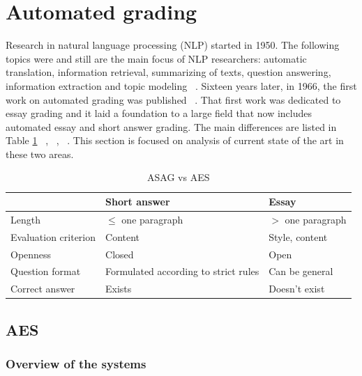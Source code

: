 \section{\textbf{Automated grading}}

Research in natural language processing (NLP) started in 1950. The following topics were and still are the main focus of NLP researchers: automatic translation, information retrieval, summarizing of texts, question answering, information extraction and topic modeling  ~\cite{Cambria}. Sixteen years later, in 1966, the first work on automated grading was published ~\cite{Page}. That first work was dedicated to essay grading and it laid a foundation to a large field that now includes automated essay and short answer grading. The main differences are listed in Table \ref{ASAGvsAES} ~\cite{Burrows}, ~\cite{Hasanah}, ~\cite{Ziai}. This section is focused on analysis of current state of the art in these two areas.

\begin{table}[h!]
\centering
\caption{ASAG vs AES}
\label{ASAGvsAES}
\begin{tabular}{|l|l|l|}
\hline
 & Short answer &  Essay \\ \hline
 Length & $\leq$ one paragraph & $>$ one paragraph  \\ \hline
 Evaluation criterion & Content &  Style, content \\ \hline
 Openness & Closed &  Open \\ \hline
 Question format & Formulated according to strict rules & Can be general \\ \hline
 Correct answer & Exists & Doesn't exist \\ \hline
\end{tabular}
\end{table}



\subsection{AES}

\subsubsection{Overview of the systems}

